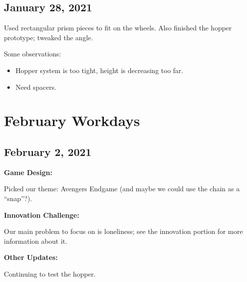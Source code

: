 \documentclass{article}
\begin{document}
\subsection{January 28, 2021}

Used rectangular prism pieces to fit on the wheels. Also finished the hopper prototype; tweaked the angle.

Some observations:
\begin{itemize}
  \item Hopper system is too tight, height is decreasing too far.
  \item Need spacers.
\end{itemize}

\section{February Workdays}

\subsection{February 2, 2021}

\textbf{Game Design:}

Picked our theme: Avengers Endgame (and maybe we could use the chain as a ``snap''?).

\textbf{Innovation Challenge:}

Our main problem to focus on is loneliness; see the innovation portion for more information about it.

\textbf{Other Updates:}

Continuing to test the hopper.

\newpage
\end{document}
